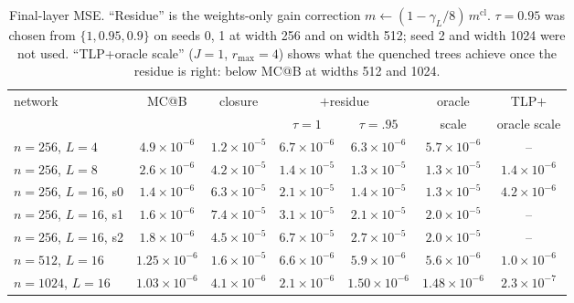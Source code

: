 \documentclass[11pt]{article}
\theoremstyle{definition}
\theoremstyle{remark}
\begin{document}
\begin{table}[h]\centering\small\setlength{\tabcolsep}{3.5pt}
\begin{tabular}{@{}lcccccc@{}}
\toprule
network & MC@B & closure & \multicolumn{2}{c}{$+$residue} & oracle & TLP$+$\\
 & & & $\tau{=}1$ & $\tau{=}.95$ & scale & oracle scale\\
\midrule
$n=256$, $L=4$ & $4.9\times10^{-6}$ & $1.2\times10^{-5}$ & $6.7\times10^{-6}$ & $6.3\times10^{-6}$ & $5.7\times10^{-6}$ & --\\
$n=256$, $L=8$ & $2.6\times10^{-6}$ & $4.2\times10^{-5}$ & $1.4\times10^{-5}$ & $1.3\times10^{-5}$ & $1.3\times10^{-5}$ & $1.4\times10^{-6}$\\
$n=256$, $L=16$, s0 & $1.4\times10^{-6}$ & $6.3\times10^{-5}$ & $2.1\times10^{-5}$ & $1.4\times10^{-5}$ & $1.3\times10^{-5}$ & $4.2\times10^{-6}$\\
$n=256$, $L=16$, s1 & $1.6\times10^{-6}$ & $7.4\times10^{-5}$ & $3.1\times10^{-5}$ & $2.1\times10^{-5}$ & $2.0\times10^{-5}$ & --\\
$n=256$, $L=16$, s2 & $1.8\times10^{-6}$ & $4.5\times10^{-5}$ & $6.7\times10^{-5}$ & $2.7\times10^{-5}$ & $2.0\times10^{-5}$ & --\\
$n=512$, $L=16$ & $1.25\times10^{-6}$ & $1.6\times10^{-5}$ & $6.6\times10^{-6}$ & $5.9\times10^{-6}$ & $5.6\times10^{-6}$ & $1.0\times10^{-6}$\\
$n=1024$, $L=16$ & $1.03\times10^{-6}$ & $4.1\times10^{-6}$ & $2.1\times10^{-6}$ & $1.50\times10^{-6}$ & $1.48\times10^{-6}$ & $2.3\times10^{-7}$\\
\bottomrule
\end{tabular}
\caption{Final-layer MSE. ``Residue'' is the weights-only gain correction $m\leftarrow(1-\gamma_L/8)\,m^{\mathrm{cl}}$. $\tau=0.95$ was chosen from $\{1,0.95,0.9\}$ on seeds 0, 1 at width 256 and on width 512; seed 2 and width 1024 were not used. ``TLP+oracle scale'' ($J=1$, $r_{\max}=4$) shows what the quenched trees achieve once the residue is right: below MC@B at widths 512 and 1024.}\label{tab:residue}
\end{table}
\end{document}
